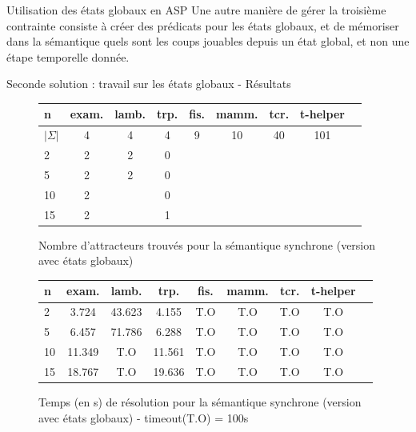 \documentclass{beamer}
\begin{document}
\begin{frame}{Utilisation des états globaux en ASP}
	\pause
	Une autre manière de gérer la troisième contrainte consiste à créer des prédicats pour les états globaux, et de mémoriser dans la sémantique quels sont les coups jouables depuis un état global, et non une étape temporelle 	
	donnée.\\
	
\end{frame}

\begin{frame}{Seconde solution : travail sur les états globaux - Résultats}
	\begin{figure}[!h]
		\begin{tabular}{l|c<{\onslide<2->}c<{\onslide<3->}c<{\onslide<4->}c<{\onslide<5->}c<{\onslide<6->}c<{\onslide<7->}c<{\onslide}c}
			n & exam. & lamb. & trp. & fis. & mamm. & tcr. & t-helper \\ \hline
			$|\Sigma|$ & 4 & 4 & 4 & 9 & 10 & 40 & 101\\ \hline
			2     & 2 & 2 & 0 &  &  &  & \\
			5     & 2 & 2 & 0 &  &  &  & \\
			10    & 2 &  & 0 &  &  &  & \\
			15    & 2 &  & 1 &  &  &  & 
		\end{tabular}
		\caption{Nombre d'attracteurs trouvés pour la sémantique synchrone (version avec états globaux)}
		\label{label-figure7}
	\end{figure}
	
	\begin{figure}[!h]
		\begin{tabular}{l|c<{\onslide<2->}c<{\onslide<3->}c<{\onslide<4->}c<{\onslide<5->}c<{\onslide<6->}c<{\onslide<7->}c<{\onslide}c}
			n & exam. & lamb. & trp. & fis. & mamm. & tcr. & t-helper \\ \hline
			2     & 3.724 & 43.623 & 4.155 & T.O & T.O & T.O & T.O\\
			5     & 6.457 & 71.786 & 6.288 & T.O & T.O & T.O & T.O\\
			10    & 11.349 & T.O & 11.561 & T.O & T.O & T.O & T.O\\
			15    & 18.767 & T.O & 19.636 & T.O & T.O & T.O & T.O
		\end{tabular}
		\caption{Temps (en s) de résolution pour la sémantique synchrone (version avec états globaux) - timeout(T.O) = 100s}
		\label{label-figure8}
	\end{figure}
\end{frame}
\end{document}
